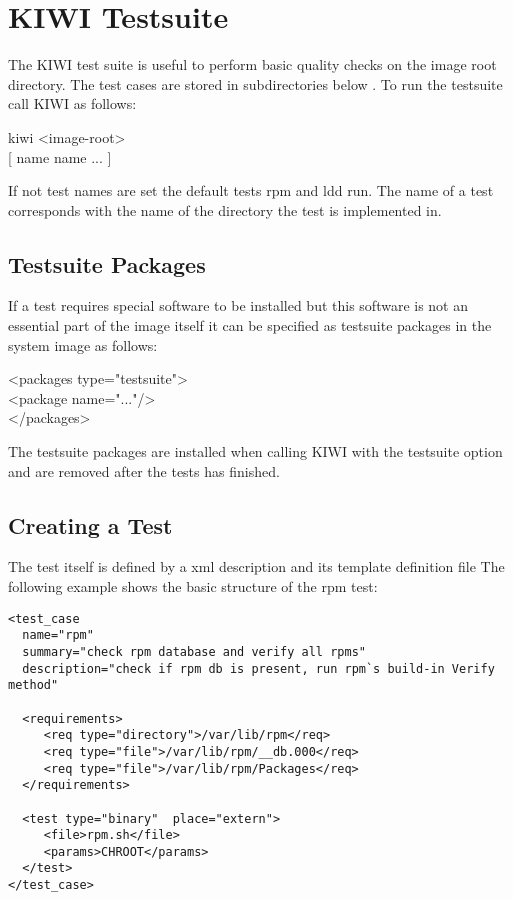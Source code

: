 \chapter{KIWI Testsuite}
\label{chapter:testing}
\minitoc

The KIWI test suite is useful to perform basic quality checks on
the image root directory. The test cases are stored in subdirectories
below . To run the testsuite call KIWI as
follows:

\begin{Command}{12cm}
 kiwi  <image-root> \bs \\
\hspace*{1cm}[  name  name ... ]
\end{Command}

If not test names are set the default tests rpm and ldd run.
The name of a test corresponds with the name of the directory
the test is implemented in.

\section{Testsuite Packages}
If a test requires special software to be installed but this
software is not an essential part of the image itself it can be
specified as testsuite packages in the system image 
as follows:

\begin{Command}{12cm}
<packages type="testsuite">\\
\hspace*{1cm}<package name="..."/>\\
</packages>
\end{Command}

The testsuite packages are installed when calling KIWI with
the testsuite option and are removed after the tests has
finished.

\section{Creating a Test}
The test itself is defined by a xml description 
and its template definition file 
The following example shows the basic structure of the rpm test:

\begin{verbatim}
<test_case 
  name="rpm"
  summary="check rpm database and verify all rpms"
  description="check if rpm db is present, run rpm`s build-in Verify method"

  <requirements>
     <req type="directory">/var/lib/rpm</req>
     <req type="file">/var/lib/rpm/__db.000</req>
     <req type="file">/var/lib/rpm/Packages</req>
  </requirements>

  <test type="binary"  place="extern">
     <file>rpm.sh</file>
     <params>CHROOT</params>
  </test>
</test_case>
\end{verbatim}

